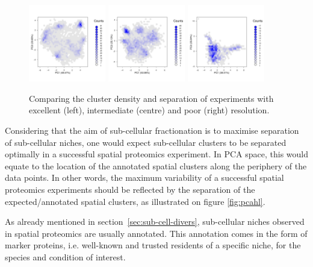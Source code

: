 \documentclass[12pt]{article}\usepackage[]{graphicx}\usepackage[]{color}
\begin{document}
\begin{figure}[ht]
  \centering
  \includegraphics[width = 0.3\textwidth]{./figure/hexbin-1.pdf}
  \includegraphics[width = 0.3\textwidth]{./figure/hexbin-2.pdf}
  \includegraphics[width = 0.3\textwidth]{./figure/hexbin-3.pdf}
  \caption{Comparing the cluster density and separation of experiments
    with excellent (left), intermediate (centre) and poor (right)
    resolution.}
  \label{fig:hexbin1}
\end{figure}

Considering that the aim of sub-cellular fractionation is to maximise
separation of sub-cellular niches, one would expect sub-cellular
clusters to be separated optimally in a successful spatial proteomics
experiment. In PCA space, this would equate to the location of the
annotated spatial clusters along the periphery of the data points. In
other words, the maximum variability of a successful spatial
proteomics experiments should be reflected by the separation of the
expected/annotated spatial clusters, as illustrated on figure
\ref{fig:pcahl}.

As already mentioned in section~\ref{sec:sub-cell-divers},
sub-cellular niches observed in spatial proteomics are usually
annotated. This annotation comes in the form of marker proteins,
i.e. well-known and trusted residents of a specific niche, for the
species and condition of interest.
\end{document}
